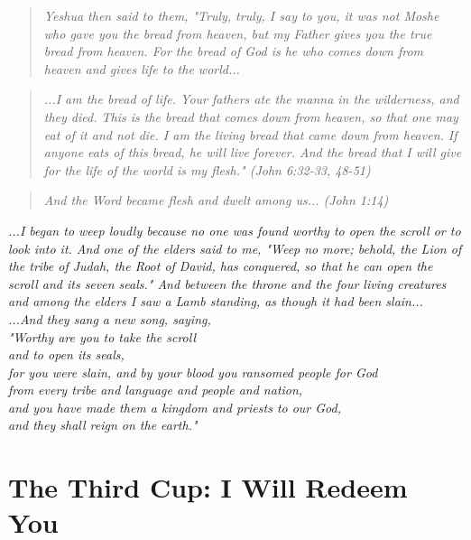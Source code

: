\documentclass[10pt,oneside,footinclude=true,headinclude=true]{scrbook} %
\newcommand\quot[1]{
	\begin{quote}\textit{\small#1}\end{quote}
}
\newcommand\pagequot[1]{
	\newpage
	\clearscrheadfoot
	\vspace*{\stretch{2}}
	\begin{center}
	\begin{minipage}[c]{8cm}
		#1
	\end{minipage}
	\end{center}
	\vspace*{\stretch{3}}
}
\begin{document}
\quot{Yeshua then said to them, "Truly, truly, I say to you, it was not Moshe who gave you the bread from heaven, but my Father gives you the true bread from heaven. For the bread of God is he who comes down from heaven and gives life to the world...}

\quot{...I am the bread of life. Your fathers ate the manna in the wilderness, and they died. This is the bread that comes down from heaven, so that one may eat of it and not die. I am the living bread that came down from heaven. If anyone eats of this bread, he will live forever. And the bread that I will give for the life of the world is my flesh." (John 6:32-33, 48-51)} 

\quot{And the Word became flesh and dwelt among us... (John 1:14)}

\pagequot{
\centering
\textit{...I began to weep loudly because no one was found worthy to open the scroll or to look into it. And one of the elders said to me, "Weep no more; behold, the Lion of the tribe of Judah, the Root of David, has conquered, so that he can open the scroll and its seven seals." And between the throne and the four living creatures and among the elders I saw a Lamb standing, as though it had been slain...\\
\vspace{2mm}
...And they sang a new song, saying,\\
"Worthy are you to take the scroll\\
\hspace*{5mm}and to open its seals,\\
for you were slain, and by your blood you ransomed people for God\\
\hspace*{5mm}from every tribe and language and people and nation,\\
and you have made them a kingdom and priests to our God,\\
\hspace*{5mm}and they shall reign on the earth."}\\
\bigskip
\spacedlowsmallcaps{Revelation 5:4-6, 9-10}
}

\part{The Third Cup: I Will Redeem You}
\end{document}

